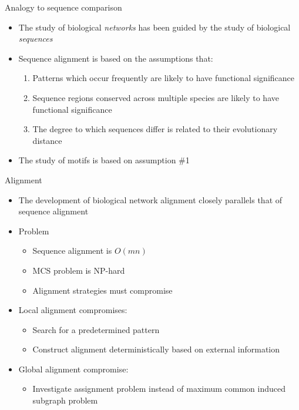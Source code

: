 \documentclass[xcolor=dvipsnames, 14pt]{beamer}
\begin{document}
\begin{frame}{Analogy to sequence comparison}
\begin{itemize}
\item The study of biological \textit{networks} has been guided by the study of biological \textit{sequences}
\pause
\item Sequence alignment is based on the assumptions that:
\pause
\begin{enumerate}
\item Patterns which occur frequently are likely to have functional significance
\pause
\item Sequence regions conserved across multiple species are likely to have functional significance
\pause
\item The degree to which sequences differ is related to their evolutionary distance
\end{enumerate}
\pause
\item The study of motifs is based on assumption \#1
\end{itemize}
\end{frame}

\begin{frame}{Alignment}
\begin{itemize}
\item The development of biological network alignment closely parallels that of sequence alignment
\pause
\item Problem
\pause
\begin{itemize}
\item Sequence alignment is $O(mn)$
\item MCS problem is NP-hard
\pause
\item Alignment strategies must compromise
\end{itemize}
\pause
\item Local alignment compromises:
\begin{itemize}
\pause
\item Search for a predetermined pattern 
\item Construct alignment deterministically based on external information
\pause
\end{itemize}
\item Global alignment compromise:
\pause
\begin{itemize}
\item Investigate assignment problem instead of maximum common induced subgraph problem
\end{itemize}
\end{itemize}
\end{frame}
\end{document}
